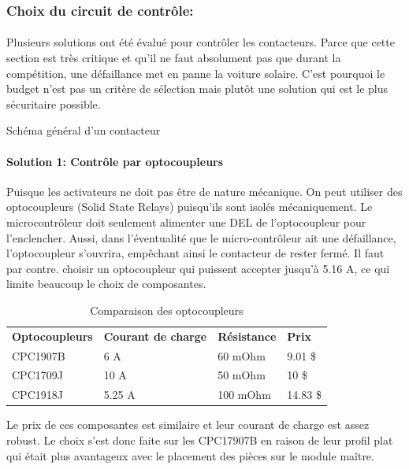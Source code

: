 	\subsubsection*{Choix du circuit de contrôle:}
		\paragraph*{}
		Plusieurs solutions ont été évalué pour contrôler les contacteurs. Parce que cette section est très critique et qu'il ne faut absolument pas que durant la compétition, une défaillance met en panne la voiture solaire. C'est pourquoi le budget n'est pas un critère de sélection mais plutôt une solution qui est le plus sécuritaire possible.

		Schéma général d'un contacteur 

		\paragraph*{Solution 1: Contrôle par optocoupleurs}
			
		Puisque les activateurs ne doit pas être de nature mécanique. On peut utiliser des optocoupleurs (Solid State Relays) puisqu'ils sont isolés mécaniquement. Le microcontrôleur doit seulement alimenter une DEL de l'optocoupleur pour l'enclencher. Aussi, dans l'éventualité que le micro-contrôleur ait une défaillance, l'optocoupleur s'ouvrira, empêchant ainsi le contacteur de rester fermé. Il faut par contre. choisir un optocoupleur qui puissent accepter jusqu'à 5.16 A, ce qui limite beaucoup le choix de composantes.
		
		\begin{table}[H]
			\centering
			\caption{Comparaison des optocoupleurs}
			\label{my-label}
			\begin{tabular}{|p{3cm}|p{3cm}|p{3cm}|p{3cm}|}
				\hline
				\textbf{Optocoupleurs} & \textbf{Courant de charge} & \textbf{Résistance} & \textbf{Prix}
				\\ \hhline{|=|=|=|=|}
				CPC1907B &
				6 A &
				60 mOhm &
				9.01 \$
				\\ \hline
				CPC1709J &
				10 A &
				50 mOhm &
				10 \$
				\\ \hline
				CPC1918J &
				5.25 A &
				100 mOhm &
				14.83 \$ 		
				\\ \hline
			\end{tabular}
		\end{table}
		
		Le prix de ces composantes est similaire et leur courant de charge est assez robust. Le choix s'est donc faite sur les CPC17907B en raison de leur profil plat qui était plus avantageux avec le placement des pièces sur le module maître.
		
